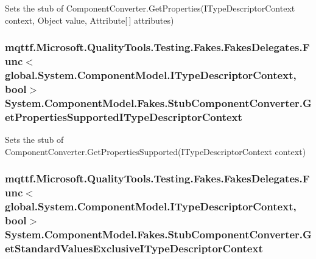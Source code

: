 Sets the stub of Component\-Converter.\-Get\-Properties(\-I\-Type\-Descriptor\-Context context, Object value, Attribute\mbox{[}$\,$\mbox{]} attributes)

\hypertarget{class_system_1_1_component_model_1_1_fakes_1_1_stub_component_converter_afd46cf5276f351980b61d0b0f936ad2f}{
\subsubsection[{Get\-Properties\-Supported\-I\-Type\-Descriptor\-Context}]{\setlength{\rightskip}{0pt plus 5cm}mqttf.\-Microsoft.\-Quality\-Tools.\-Testing.\-Fakes.\-Fakes\-Delegates.\-Func$<$global.\-System.\-Component\-Model.\-I\-Type\-Descriptor\-Context, bool$>$ System.\-Component\-Model.\-Fakes.\-Stub\-Component\-Converter.\-Get\-Properties\-Supported\-I\-Type\-Descriptor\-Context}}\label{class_system_1_1_component_model_1_1_fakes_1_1_stub_component_converter_afd46cf5276f351980b61d0b0f936ad2f}


Sets the stub of Component\-Converter.\-Get\-Properties\-Supported(\-I\-Type\-Descriptor\-Context context)

\hypertarget{class_system_1_1_component_model_1_1_fakes_1_1_stub_component_converter_ab0461f4b6c0c4c9a402852dd24e12053}{
\subsubsection[{Get\-Standard\-Values\-Exclusive\-I\-Type\-Descriptor\-Context}]{\setlength{\rightskip}{0pt plus 5cm}mqttf.\-Microsoft.\-Quality\-Tools.\-Testing.\-Fakes.\-Fakes\-Delegates.\-Func$<$global.\-System.\-Component\-Model.\-I\-Type\-Descriptor\-Context, bool$>$ System.\-Component\-Model.\-Fakes.\-Stub\-Component\-Converter.\-Get\-Standard\-Values\-Exclusive\-I\-Type\-Descriptor\-Context}}\label{class_system_1_1_component_model_1_1_fakes_1_1_stub_component_converter_ab0461f4b6c0c4c9a402852dd24e12053}


